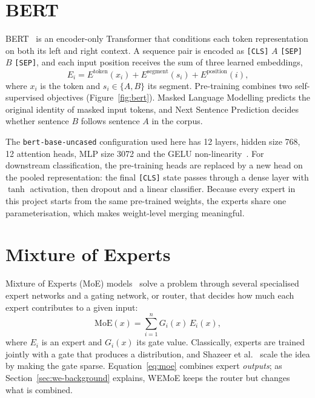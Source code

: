 \section{BERT}

BERT~\cite{devlin2019bert} is an encoder-only Transformer that conditions each token representation on both its left and right context. A sequence pair is encoded as \texttt{[CLS]} $A$ \texttt{[SEP]} $B$ \texttt{[SEP]}, and each input position receives the sum of three learned embeddings,
\begin{equation}
E_i=E^{\mathrm{token}}(x_i)+E^{\mathrm{segment}}(s_i)+E^{\mathrm{position}}(i),
\label{eq:bert-input}
\end{equation}
where $x_i$ is the token and $s_i\in\{A,B\}$ its segment. Pre-training combines two self-supervised objectives (Figure~\ref{fig:bert}). Masked Language Modelling predicts the original identity of masked input tokens, and Next Sentence Prediction decides whether sentence $B$ follows sentence $A$ in the corpus.

The \texttt{bert-base-uncased} configuration used here has 12 layers, hidden size 768, 12 attention heads, MLP size 3072 and the GELU non-linearity~\cite{hendrycks2016gelu}. For downstream classification, the pre-training heads are replaced by a new head on the pooled representation: the final \texttt{[CLS]} state passes through a dense layer with $\tanh$ activation, then dropout and a linear classifier. Because every expert in this project starts from the same pre-trained weights, the experts share one parameterisation, which makes weight-level merging meaningful.

\section{Mixture of Experts}

Mixture of Experts (MoE) models~\cite{jacobs1991adaptive,mu2025survey} solve a problem through several specialised expert networks and a gating network, or router, that decides how much each expert contributes to a given input:
\begin{equation}
\mathrm{MoE}(x)=\sum_{i=1}^{n}G_i(x)\,E_i(x),
\label{eq:moe}
\end{equation}
where $E_i$ is an expert and $G_i(x)$ its gate value. Classically, experts are trained jointly with a gate that produces a distribution, and Shazeer et al.~\cite{shazeer2017moe} scale the idea by making the gate sparse. Equation~\eqref{eq:moe} combines expert \emph{outputs}; as Section~\ref{sec:we-background} explains, WEMoE keeps the router but changes what is combined.

